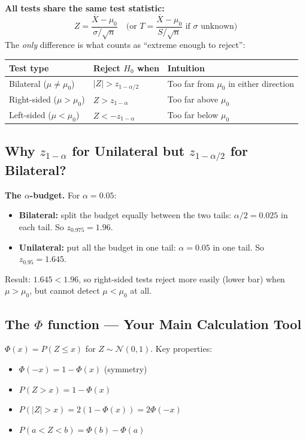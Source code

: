 \documentclass[11pt,a4paper]{article}
\begin{document}
\begin{tcolorbox}[formulabox]
\textbf{All tests share the same test statistic:}
\[
  Z = \frac{\overline{X}-\mu_0}{\sigma/\sqrt{n}} \quad\text{(or }T=\frac{\overline{X}-\mu_0}{S/\sqrt{n}}\text{ if }\sigma\text{ unknown)}
\]
The \emph{only} difference is what counts as ``extreme enough to reject'':

\begin{center}
\renewcommand{\arraystretch}{1.5}
\begin{tabular}{@{}lll@{}}
\toprule
\textbf{Test type} & \textbf{Reject $H_0$ when} & \textbf{Intuition}\\
\midrule
Bilateral ($\mu\neq\mu_0$) & $|Z|>z_{1-\alpha/2}$ & Too far from $\mu_0$ in either direction\\
Right-sided ($\mu>\mu_0$) & $Z>z_{1-\alpha}$ & Too far above $\mu_0$\\
Left-sided ($\mu<\mu_0$) & $Z<-z_{1-\alpha}$ & Too far below $\mu_0$\\
\bottomrule
\end{tabular}
\end{center}
\end{tcolorbox}

\subsection{Why $z_{1-\alpha}$ for Unilateral but $z_{1-\alpha/2}$ for Bilateral?}

\textbf{The $\alpha$-budget.} For $\alpha=0.05$:
\begin{itemize}
  \item \textbf{Bilateral:} split the budget equally between the two tails: $\alpha/2=0.025$ in each tail. So $z_{0.975}=1.96$.
  \item \textbf{Unilateral:} put all the budget in one tail: $\alpha=0.05$ in one tail. So $z_{0.95}=1.645$.
\end{itemize}
Result: $1.645 < 1.96$, so right-sided tests reject more easily (lower bar) when $\mu>\mu_0$, but cannot detect $\mu<\mu_0$ at all.

\subsection{The $\Phi$ function --- Your Main Calculation Tool}

$\Phi(x) = P(Z\leq x)$ for $Z\sim\mathcal{N}(0,1)$. Key properties:
\begin{itemize}
  \item $\Phi(-x) = 1-\Phi(x)$ (symmetry)
  \item $P(Z>x) = 1-\Phi(x)$
  \item $P(|Z|>x) = 2(1-\Phi(x)) = 2\Phi(-x)$
  \item $P(a<Z<b) = \Phi(b)-\Phi(a)$
\end{itemize}
\end{document}
